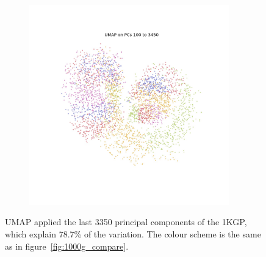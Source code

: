 \documentclass[12pt]{pnas-new}
\begin{document}
\begin{figure}
    \centering
    \begin{subfigure}{0.95\textwidth}
    \includegraphics[width=0.95\textwidth]{images/1KGP_UMAP_PCS100_PCE3450_NC2_NN15_MD05_201944185843.jpeg}
    \end{subfigure}
    \caption{UMAP applied the last 3350 principal components of the 1KGP, which explain 78.7\% of the variation. The colour scheme is the same as in figure~\ref{fig:1000g_compare}.}
    \label{fig:supp_1kgp_3350}
\end{figure}
\end{document}
